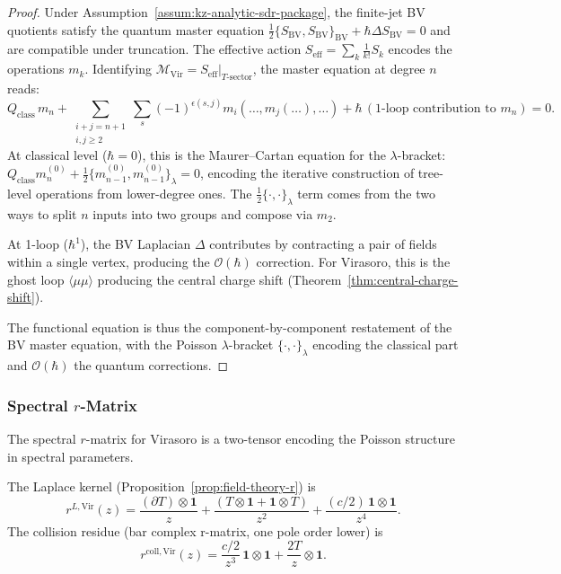 \begin{proof}
Under Assumption~\ref{assum:kz-analytic-sdr-package}, the finite-jet
BV quotients satisfy the quantum master equation
$\tfrac{1}{2}\{S_{\mathrm{BV}}, S_{\mathrm{BV}}\}_{\mathrm{BV}}
+ \hbar\Delta S_{\mathrm{BV}} = 0$ and are compatible under
truncation. The effective action
$S_{\mathrm{eff}} = \sum_k \frac{1}{k!} S_k$ encodes the operations
$m_k$. Identifying
$\mathcal{M}_{\mathrm{Vir}} = S_{\mathrm{eff}}|_{T\text{-sector}}$,
the master equation at degree $n$ reads:
\[
Q_{\mathrm{class}}\, m_n + \sum_{\substack{i+j=n+1\\i,j\ge 2}} \sum_{s} (-1)^{\epsilon(s,j)} m_i(\ldots, m_j(\ldots), \ldots) + \hbar\,(\text{1-loop contribution to } m_n) = 0.
\]
At classical level ($\hbar = 0$), this is the Maurer--Cartan equation for the $\lambda$-bracket: $Q_{\mathrm{class}} m_n^{(0)} + \frac{1}{2}\{m_{n-1}^{(0)}, m_{n-1}^{(0)}\}_\lambda = 0$, encoding the iterative construction of tree-level operations from lower-degree ones. The $\frac{1}{2}\{\cdot, \cdot\}_\lambda$ term comes from the two ways to split $n$ inputs into two groups and compose via $m_2$.

At 1-loop ($\hbar^1$), the BV Laplacian $\Delta$ contributes by contracting a pair of fields within a single vertex, producing the $\mathcal{O}(\hbar)$ correction. For Virasoro, this is the ghost loop $\langle\mu\mu\rangle$ producing the central charge shift (Theorem~\ref{thm:central-charge-shift}).

The functional equation is thus the component-by-component restatement of the BV master equation, with the Poisson $\lambda$-bracket $\{\cdot, \cdot\}_\lambda$ encoding the classical part and $\mathcal{O}(\hbar)$ the quantum corrections.
\end{proof}

\subsubsection{Spectral $r$-Matrix}

The spectral $r$-matrix for Virasoro is a two-tensor encoding the Poisson structure in spectral parameters.

\begin{definition}
The Laplace kernel (Proposition~\ref{prop:field-theory-r}) is
\begin{equation}
r^{L,\text{Vir}}(z)
= \frac{(\partial T) \otimes \mathbf{1}}{z}
+ \frac{(T \otimes \mathbf{1} + \mathbf{1} \otimes T)}{z^2}
+ \frac{(c/2)\,\mathbf{1} \otimes \mathbf{1}}{z^4}.
\end{equation}
The collision residue (bar complex r-matrix, one pole order lower)
is
\begin{equation}
r^{\mathrm{coll},\text{Vir}}(z) = \frac{c/2}{z^3}\,\mathbf{1}\otimes\mathbf{1} + \frac{2T}{z}\otimes\mathbf{1}.
\end{equation}
\end{definition}

